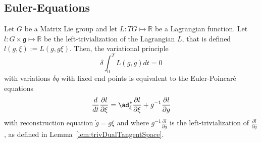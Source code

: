\subsection{Euler-\Poincare Equations}
\begin{theorem}
\label{thm:leastActionPrincipleForLieGroups}
Let $G$ be a Matrix Lie group and let $L : TG \mapsto \mathbb{R}$ be a Lagrangian function.
Let $l: G \times \mathfrak{g} \mapsto \mathbb{R}$ be the left-trivialization of the Lagrangian $L$, that is
defined $l(g,\xi) := L(g,g{\xi})$. Then, 
the variational principle
\begin{equation}
\label{eq:variationalSingleBody}
\delta \int_0^T L(g,\dot{g}) dt = 0
\end{equation}
with variations $\delta q$ with fixed end points is 
equivalent to the Euler-Poincar\`{e} equations
\begin{equation}
\label{eq:eulerPoincareDefinition}
\frac{d}{dt} \frac{\partial l}{\partial \xi} = \ad_{\xi}^* \frac{\partial l}{\partial \xi} + g^{-1} \frac{\partial l}{\partial g}
\end{equation}
with reconstruction equation $\dot g = g \xi$
and where
$g^{-1} \frac{\partial l}{\partial g}$ is the left-trivialization of $\frac{\partial l}{\partial g}$, as defined in Lemma~\ref{lem:trivDualTangentSpace}. 
\end{theorem}

